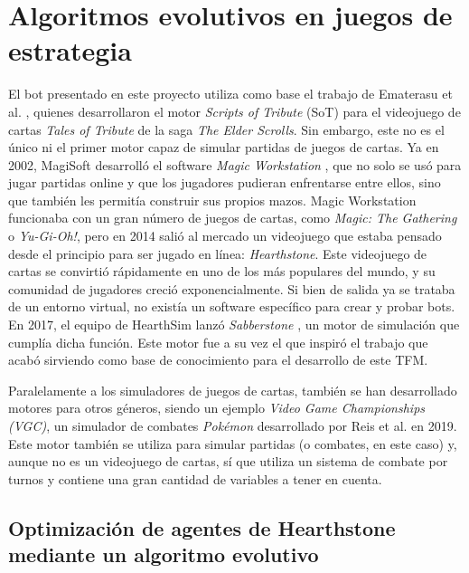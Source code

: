 \section{Algoritmos evolutivos en juegos de estrategia} \label{sec:trabajos_relacionados}

El bot presentado en este proyecto utiliza como base el trabajo de Ematerasu et al. \cite{ematerasu_scriptsoftribute_2022}, quienes desarrollaron el motor \textit{Scripts of Tribute} (SoT) para el videojuego de cartas \textit{Tales of Tribute} de la saga \textit{The Elder Scrolls}. Sin embargo, este no es el único ni el primer motor capaz de simular partidas de juegos de cartas. Ya en 2002, MagiSoft desarrolló el software \textit{Magic Workstation} \cite{magi-soft_development_magic_2002}, que no solo se usó para jugar partidas online y que los jugadores pudieran enfrentarse entre ellos, sino que también les permitía construir sus propios mazos. Magic Workstation funcionaba con un gran número de juegos de cartas, como \textit{Magic: The Gathering} o \textit{Yu-Gi-Oh!}, pero en 2014 salió al mercado un videojuego que estaba pensado desde el principio para ser jugado en línea: \textit{Hearthstone}. Este videojuego de cartas se convirtió rápidamente en uno de los más populares del mundo, y su comunidad de jugadores creció exponencialmente. Si bien de salida ya se trataba de un entorno virtual, no existía un software específico para crear y probar bots. En 2017, el equipo de HearthSim lanzó \textit{Sabberstone} \cite{hearthsim_hearthsimsabberstone_2017}, un motor de simulación que cumplía dicha función. Este motor fue a su vez el que inspiró el trabajo que acabó sirviendo como base de conocimiento para el desarrollo de este TFM.

Paralelamente a los simuladores de juegos de cartas, también se han desarrollado motores para otros géneros, siendo un ejemplo \textit{Video Game Championships (VGC)}, un simulador de combates \textit{Pokémon} desarrollado por Reis et al. \cite{simao_reis_vgc_2019} en 2019. Este motor también se utiliza para simular partidas (o combates, en este caso) y, aunque no es un videojuego de cartas, sí que utiliza un sistema de combate por turnos y contiene una gran cantidad de variables a tener en cuenta.

\subsection{Optimización de agentes de Hearthstone mediante un algoritmo evolutivo} \label{sec:algoritmo_evolutivo_sabberstone}

